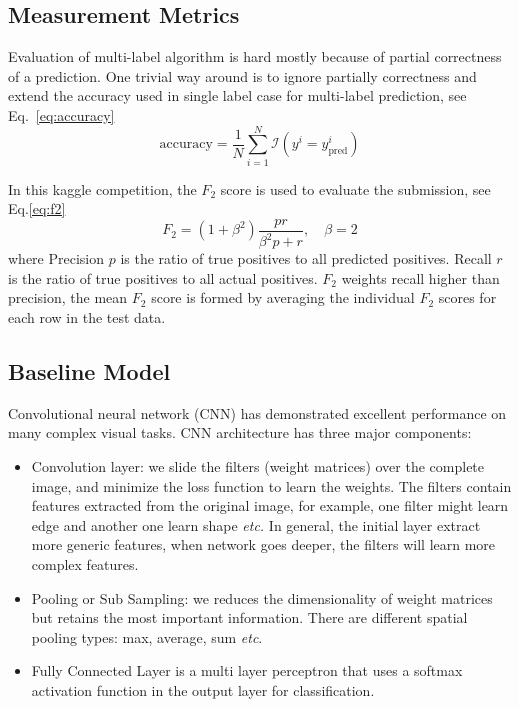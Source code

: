 \documentclass[11pt,oneside,a4paper]{article}
\begin{document}
\subsection{Measurement Metrics}
Evaluation of multi-label algorithm is hard mostly because of partial correctness of a prediction. One trivial way around is to ignore partially correctness and extend the accuracy used in single label case for multi-label prediction, see Eq.~\ref{eq:accuracy}
\begin{equation}
\mathrm{accuracy} = \frac{1}{N}\sum^{N}_{i = 1}\mathcal{I}(y^i = y^i_{\mathrm{pred}})\label{eq:accuracy}
\end{equation}

In this kaggle competition, the $F_2$ score is used to evaluate the submission, see Eq.\ref{eq:f2}
\begin{equation}
F_{2} = (1+\beta^{2})\frac{pr}{\beta^2 p + r}, \quad \beta = 2 \label{eq:f2}
\end{equation}
where Precision $p$ is the ratio of true positives to all predicted positives. Recall $r$ is the ratio of true positives to all actual positives. $F_2$ weights recall higher than precision, the mean $F_2$ score is formed by averaging the individual $F_2$ scores for each row in the test data. 

\subsection{Baseline Model}
Convolutional neural network (CNN) has demonstrated excellent performance on many complex visual tasks. CNN architecture has three major components:
\begin{itemize}
\item  Convolution layer: we slide the filters (weight matrices) over the complete image, and minimize the loss function to learn the weights. The filters contain features extracted from the original image, for example, one filter might learn edge and another one learn shape \emph{etc.} In general, the initial layer extract more generic features, when network goes deeper, the filters will learn more complex features. 
\item Pooling or Sub Sampling: we reduces the dimensionality of weight matrices but retains the most important information. There are different spatial pooling types: max, average, sum \emph{etc}.
\item Fully Connected Layer is a multi layer perceptron that uses a softmax activation function in the output layer for classification.
\end{itemize}
\end{document}
